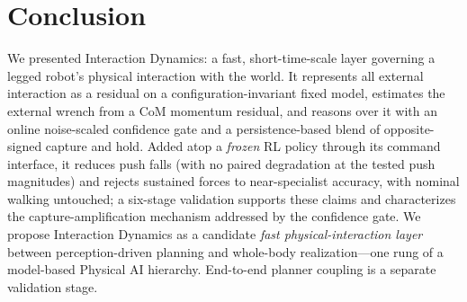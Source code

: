 \documentclass[journal]{IEEEtran}
\begin{document}
\section{Conclusion}
\label{sec:conclusion}

We presented Interaction Dynamics: a fast, short-time-scale layer governing a legged robot's physical interaction 
with the world. It represents all external interaction as a residual on a configuration-invariant fixed model, 
estimates the external wrench from a CoM momentum residual, and reasons over it with an online noise-scaled confidence 
gate and a persistence-based blend of opposite-signed capture and hold. Added atop a \emph{frozen} RL policy through 
its command interface, it reduces push falls (with no paired degradation at the tested push magnitudes) and rejects sustained forces to 
near-specialist accuracy, with nominal walking untouched; a six-stage validation supports these claims
and characterizes the capture-amplification mechanism addressed by the confidence gate. We propose Interaction Dynamics as a
candidate \emph{fast physical-interaction layer} between perception-driven planning and whole-body 
realization---one rung of a model-based Physical AI hierarchy. End-to-end planner coupling is a separate validation stage.
\end{document}
